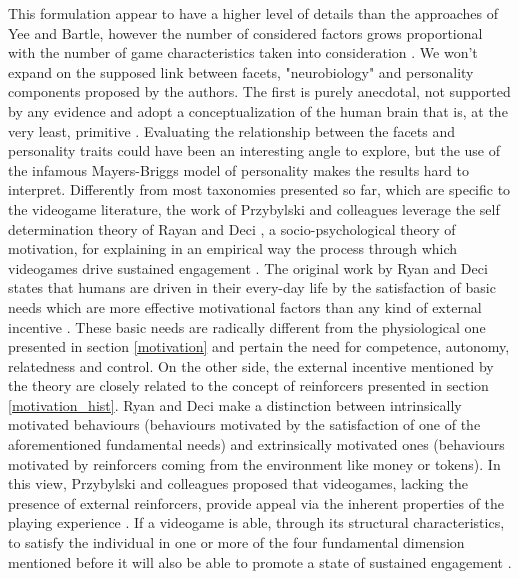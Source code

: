 This formulation appear to have a higher level of details than the approaches of Yee and Bartle, however the number of considered factors grows proportional with the number of game characteristics taken into consideration \cite{nacke2011brainhex}. We won't expand on the supposed link between facets, "neurobiology" and personality components proposed by the authors. The first is purely anecdotal, not supported by any evidence and adopt a conceptualization of the human brain that is, at the very least, primitive \cite{nacke2011brainhex}. Evaluating the relationship between the facets and personality traits could have been an interesting angle to explore, but the use of the infamous Mayers-Briggs model of personality \cite{boyle1995myers} makes the results hard to interpret. Differently from most taxonomies presented so far, which are specific to the videogame literature, the work of Przybylski and colleagues leverage the self determination theory of Rayan and Deci \cite{ryan2000self,ryan2006motivational}, a socio-psychological theory of  motivation, for explaining in an empirical way the process through which videogames drive sustained engagement \cite{przybylski2010motivational}. The original work by Ryan and Deci states that humans are driven in their every-day life by the satisfaction of basic needs which are more effective motivational factors than any kind of  external incentive \cite{ryan2000self,ryan2006motivational}. These basic needs are radically different from the physiological one presented in section \ref{motivation} and pertain the need for competence, autonomy, relatedness and control. On the other side, the external incentive mentioned by the theory are closely related to the concept of reinforcers presented in section \ref{motivation_hist}. Ryan and Deci make a distinction between intrinsically motivated behaviours (behaviours motivated by the satisfaction of one of the aforementioned fundamental needs) and extrinsically motivated ones (behaviours motivated by reinforcers coming from the environment like money or tokens). In this view, Przybylski and colleagues proposed that videogames, lacking the presence of external reinforcers, provide appeal via the inherent properties of the playing experience \cite{przybylski2010motivational}. If a videogame is able, through its structural characteristics, to satisfy the individual in one or more of the four fundamental dimension mentioned before it will also be able to promote a state of sustained engagement \cite{przybylski2010motivational}.


